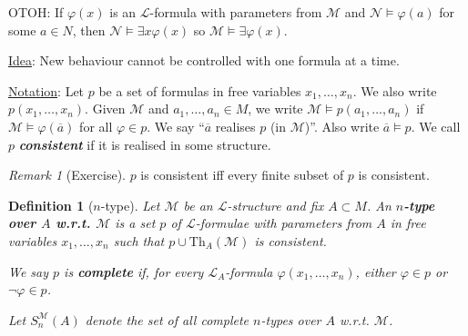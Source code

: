 \documentclass[]{article}
\theoremstyle{custhm}
\theoremstyle{cusdef}
\newtheorem{defin}[theorem]{Definition}
\theoremstyle{custhm}
\theoremstyle{custhm}
\theoremstyle{custhm}
\theoremstyle{ex}
\theoremstyle{custhm}
\theoremstyle{cusdef}
\theoremstyle{remark}
\newtheorem*{remark*}{Remark}
\theoremstyle{remark}
\newcommand{\undf}[1]{\textit{\textbf{#1}}}
\renewcommand{\L}{\mathcal{L}}
\newcommand{\M}{\mathcal{M}}
\renewcommand{\phi}{\varphi}
\renewcommand{\bar}{\overline}
\newcommand{\Th}{\textrm{Th}}
\newcommand{\N}{\mathcal{N}}
\begin{document}
OTOH: If $\phi(x)$ is an $\L$-formula with parameters from $\M$ and $\N\models \phi(a)$ for some $a\in N$, then $\N\models \exists x\phi(x)$ so $\M\models \exists \phi(x)$.

\underline{Idea}: New behaviour cannot be controlled with one formula at a time.

\underline{Notation}: Let $p$ be a set of formulas in free variables $x_1,\dots,x_n$. We also write $p(x_1,\dots,x_n)$. Given $\M$ and $a_1,\dots,a_n\in M$, we write $\M\models p(a_1,\dots,a_n)$ if $\M\models \phi(\bar{a})$ for all $\phi\in p$. We say ``$\bar{a}$ realises $p$ (in $\M$)''. Also write $\bar{a}\models p$. We call $p$ \undf{consistent} if it is realised in some structure.

\begin{remark*}[Exercise]
$p$ is consistent iff every finite subset of $p$ is consistent.
\end{remark*}

\begin{defin}[$n$-type]
Let $\M$ be an $\L$-structure and fix $A\subset M$. An \undf{$n$-type over $A$ w.r.t. $\M$} is a set $p$ of $\L$-formulae with parameters from $A$ in free variables $x_1,\dots,x_n$ such that $p\cup \Th_A(\M)$ is consistent.

We say $p$ is \undf{complete} if, for every $\L_A$-formula $\phi(x_1,\dots,x_n)$, either $\phi \in p$ or $\neg \phi \in p$.

Let $S_n^\M(A)$ denote the set of all complete $n$-types over $A$ w.r.t. $\M$.
\end{defin}
\end{document}
